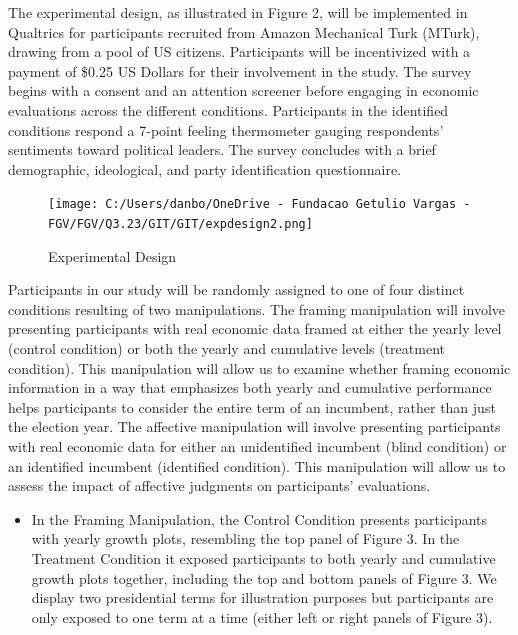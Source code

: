 \documentclass[
]{article}
\providecommand{\tightlist}{%
  \setlength{\itemsep}{0pt}\setlength{\parskip}{0pt}}
\begin{document}
The experimental design, as illustrated in Figure 2, will be implemented
in Qualtrics for participants recruited from Amazon Mechanical Turk
(MTurk), drawing from a pool of US citizens. Participants will be
incentivized with a payment of \$0.25 US Dollars for their involvement
in the study. The survey begins with a consent and an attention screener
before engaging in economic evaluations across the different conditions.
Participants in the identified conditions respond a 7-point feeling
thermometer gauging respondents' sentiments toward political leaders.
The survey concludes with a brief demographic, ideological, and party
identification questionnaire.

\begin{figure}
\hypertarget{fig:label}{%
\centering
\texttt{[image: C:/Users/danbo/OneDrive - Fundacao Getulio Vargas - FGV/FGV/Q3.23/GIT/GIT/expdesign2.png]}
\caption{Experimental Design}\label{fig:label}
}
\end{figure}

Participants in our study will be randomly assigned to one of four
distinct conditions resulting of two manipulations. The framing
manipulation will involve presenting participants with real economic
data framed at either the yearly level (control condition) or both the
yearly and cumulative levels (treatment condition). This manipulation
will allow us to examine whether framing economic information in a way
that emphasizes both yearly and cumulative performance helps
participants to consider the entire term of an incumbent, rather than
just the election year. The affective manipulation will involve
presenting participants with real economic data for either an
unidentified incumbent (blind condition) or an identified incumbent
(identified condition). This manipulation will allow us to assess the
impact of affective judgments on participants' evaluations.

\begin{itemize}
\tightlist
\item
  In the Framing Manipulation, the Control Condition presents
  participants with yearly growth plots, resembling the top panel of
  Figure 3. In the Treatment Condition it exposed participants to both
  yearly and cumulative growth plots together, including the top and
  bottom panels of Figure 3. We display two presidential terms for
  illustration purposes but participants are only exposed to one term at
  a time (either left or right panels of Figure 3).
\end{itemize}
\end{document}
